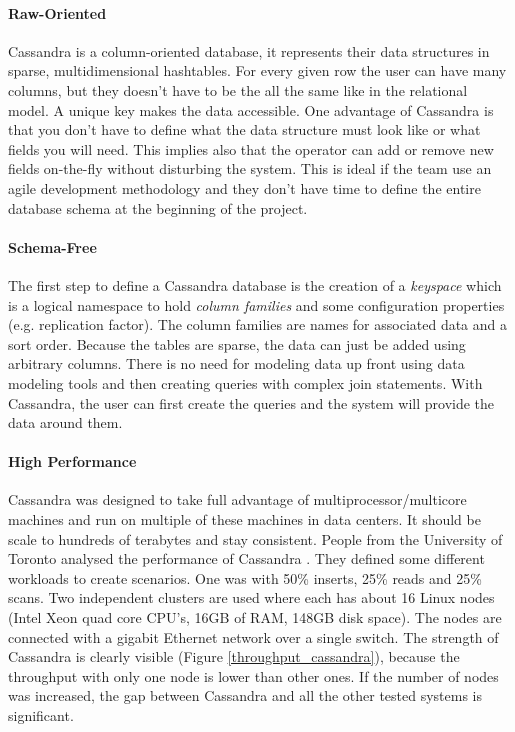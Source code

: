 \documentclass[a4paper]{article}
\begin{document}
\paragraph{Raw-Oriented}
Cassandra is a column-oriented database, it represents their data structures in sparse, multidimensional hashtables. For every given row the user can have many columns, but they doesn't have to be the all the same like in the relational model. A unique key makes the data accessible. One advantage of Cassandra is that you don't have to define what the data structure must look like or what fields you will need. This implies also that the operator can add or remove new fields on-the-fly without disturbing the system. This is ideal if the team use an agile development methodology and they don't have time to define the entire database schema at the beginning of the project.

\paragraph{Schema-Free}
The first step to define a Cassandra database is the creation of a \textit{keyspace} which is a logical namespace to hold \textit{column families} and some configuration properties (e.g. replication factor). The column families are names for associated data and a sort order. Because the tables are sparse, the data can just be added using arbitrary columns. There is no need for modeling data up front using data modeling tools and then creating queries with complex join statements. With Cassandra, the user can first create the queries and the system will provide the data around them.

\paragraph{High Performance}
Cassandra was designed to take full advantage of multiprocessor/multicore machines and run on multiple of these machines in data centers. It should be scale to hundreds of terabytes and stay consistent. People from the University of Toronto analysed the performance of Cassandra \cite{rabEtAl2012}. They defined some different workloads to create scenarios. One was with 50\% inserts, 25\% reads and 25\% scans. Two independent clusters are used where each has about 16 Linux nodes (Intel Xeon quad core CPU's, 16GB of RAM, 148GB disk space). The nodes are connected with a gigabit Ethernet network over a single switch. The strength of Cassandra is clearly visible (Figure \ref{throughput_cassandra}), because the throughput with only one node is lower than other ones. If the number of nodes was increased, the gap between Cassandra and all the other tested systems is significant.
\end{document}
